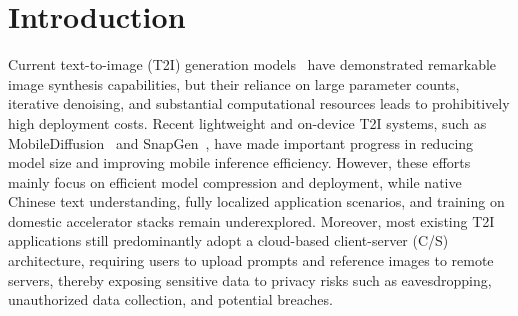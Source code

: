 \section{Introduction}
Current text-to-image (T2I) generation models~\cite{zhang2023t2i_survey,saharia2022imagen,ramesh2022dalle,podell2023sdxl,flux2024,peebles2023dit,rombach2022high,stability2022sd21,ding2021cogview,taiyi2024} have demonstrated remarkable image synthesis capabilities, but their reliance on large parameter counts, iterative denoising, and substantial computational resources leads to prohibitively high deployment costs. Recent lightweight and on-device T2I systems, such as MobileDiffusion~\cite{zhao2024mobilediffusion} and SnapGen~\cite{hu2024snapgen}, have made important progress in reducing model size and improving mobile inference efficiency. However, these efforts mainly focus on efficient model compression and deployment, while native Chinese text understanding, fully localized application scenarios, and training on domestic accelerator stacks remain underexplored. Moreover, most existing T2I applications still predominantly adopt a cloud-based client-server (C/S) architecture, requiring users to upload prompts and reference images to remote servers, thereby exposing sensitive data to privacy risks such as eavesdropping, unauthorized data collection, and potential breaches.

